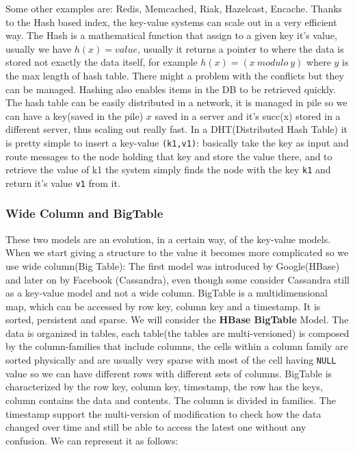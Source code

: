 \documentclass[a4page, 11pt]{article}
\begin{document}
Some other examples are: Redis, Memcached, Riak, Hazelcast, Encache.
\newline
Thanks to the Hash based index, the key-value systems can scale out in a very efficient way. 
The Hash is a mathematical function that assign to a given key it's value, usually we have $h(x) = value$, usually it returns a pointer to where the data is stored not exactly the data itself, for example $h(x) = (x\ modulo\ y)$ where $y$ is the max length of hash table. 
There might a problem with the conflicts but they can be managed. 
Hashing also enables items in the DB to be retrieved quickly. 
The hash table can be easily distributed in a network, it is managed in pile so we can have a key(saved in the pile) $x$ saved in a server and it's succ(x) stored in a different server, thus scaling out really fast. 
\newline
In a DHT(Distributed Hash Table) it is pretty simple to insert a key-value \texttt{(k1,v1)}: basically take the key as input and route messages to the node holding that key and store the value there, and to retrieve the value of k1 the system simply finds the node with the key \texttt{k1} and return it's value \texttt{v1} from it.

\subsubsection{Wide Column and BigTable}
These two models are an evolution, in a certain way, of the key-value models. When we start giving a structure to the value it becomes more complicated so we use wide column(Big Table): The first model was introduced by Google(HBase) and later on by Facebook (Cassandra), even though some consider Cassandra still  as a key-value model and not a wide column.
\newline
BigTable is a multidimensional map, which can be accessed by row key, column key and a timestamp. It is sorted, persistent and sparse.
We will consider the \textbf{HBase BigTable} Model.
The data is organized in tables, each table(the tables are multi-versioned) is composed by the column-families that include columns, the cells within a column family are sorted physically and are usually very sparse with most of the cell having \texttt{NULL} value so we can have different rows with different sets of columns. 
BigTable is characterized by the row key, column key, timestamp, the row has the keys, column contains the data and contents. 
The column is divided in families. The timestamp support the multi-version of modification to check how the data changed over time and still be able to access the latest one without any confusion. We can represent it as follows:
\end{document}
